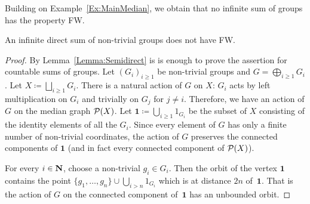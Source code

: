 Building on Example~\ref{Ex:MainMedian}, we obtain that no infinite sum of groups has the property FW.
\begin{lem}\label{Lemma:Sum}
An infinite direct sum of non-trivial groups does not have FW.
\end{lem}
\begin{proof}
By Lemma~\ref{Lemma:Semidirect} is is enough to prove the assertion for countable sums of groups.
Let $(G_i)_{i\geq1}$ be non-trivial groups and $G=\bigoplus_{i\geq 1} G_i$.
Let $X\coloneqq\bigsqcup_{i\geq 1} G_i$.
There is a natural action of $G$ on $X$: $G_i$ acts by left multiplication on $G_i$ and trivially on $G_j$ for $j\neq i$.
Therefore, we have an action of $G$ on the median graph $\mathcal P(X)$.
Let $\mathbf 1\coloneqq\bigcup_{i\geq 1} 1_{G_i}$ be the subset of $X$ consisting of the identity elements of all the $G_i$.
Since every element of $G$ has only a finite number of non-trivial coordinates, the action of $G$ preserves the connected components of $\mathbf 1$ (and in fact every connected component of $\mathcal P(X)$).

For every $i\in \mathbf{N}$, choose a non-trivial $g_i\in G_{i}$.
Then the orbit of the vertex $\mathbf 1$ contains the point $\{g_1,\dots, g_n\}\cup\bigcup_{i>n} 1_{G_{i}}$ which is at distance $2n$ of~$\mathbf 1$.
That is the action of $G$ on the connected component of~$\mathbf 1$ has an unbounded orbit.
%
%
%
%
%
\end{proof}

